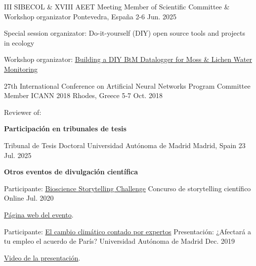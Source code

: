 \begin{cventries}
  \cventry
    {III SIBECOL \& XVIII AEET Meeting}
    {Member of Scientific Committee \& Workshop organizator}
    {Pontevedra, España}
    {2-6 Jun. 2025}
    {
  		\begin{cvitems}
        \item Special session organizator: Do-it-yourself (DIY) open source tools and projects in ecology
        \item Workshop organizator: \underline{\href{https://angellareo.github.io/workshop-btm/}{Building a DIY BtM Datalogger for Moss \& Lichen Water Monitoring}}
      \end{cvitems}
    }
\end{cventries}

\begin{cventries}
  \cventry
    {27th International Conference on Artificial Neural Networks}
    {Program Committee Member ICANN 2018}
    {Rhodes, Greece}
    {5‐7 Oct. 2018}
    {\begin{cvitems}
        \item Reviewer of: 
    \end{cvitems}	
    }
\end{cventries}

\textbf{Participación en tribunales de tesis}
\begin{cventries}
	\cventry
    {Tribunal de Tesis Doctoral}
    {Universidad Autónoma de Madrid}
    {Madrid, Spain}
    {23 Jul. 2025}
    {
  		\begin{cvitems}
  			\item {}
  		\end{cvitems}	
    }
\end{cventries}


\textbf{Otros eventos de divulgación científica}
\begin{cventries}
  \cventry
    {Participante:  \underline{\href{https://microbiosdigital.com/20/08/03/bioscience-storytelling-challenge/}{Bioscience Storytelling Challenge}}} %
    {Concurso de storytelling científico} %
    {Online} %
    {Jul. 2020} %
    {
    \begin{cvitems} %
        \item {\underline{\href{https://microbiosdigital.com/2020/08/03/bioscience-storytelling-challenge/}{Página web del evento}}.}        	
    \end{cvitems}
    }
    
  \cventry
    {Participante:  \href{https://workshops.ift.uam-csic.es/cambioclimatico/Programa}{El cambio climático contado por expertos}} %
    {Presentación: ¿Afectará a tu empleo el acuerdo de París?} %
    {Universidad Autónoma de Madrid} %
    {Dec. 2019} %
    {
    \begin{cvitems} %
        \item {\underline{\href{https://m.youtube.com/watch?v=rB3-6bywW_Q}{Video de la presentación}}.}
    \end{cvitems}
    }
\end{cventries}
